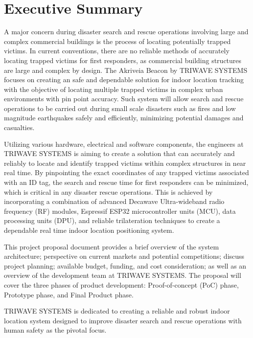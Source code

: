 

\section*{Executive Summary}	%
\bigskip
A major concern during disaster search and rescue operations involving large and complex commercial buildings is the process of locating potentially trapped victims. In current conventions, there are no reliable methods of accurately locating trapped victims for first responders, as commercial building structures are large and complex by design. The Akriveia Beacon by TRIWAVE SYSTEMS focuses on creating an safe and dependable solution for indoor location tracking with the objective of locating multiple trapped victims in complex urban environments with pin point accuracy. Such system will allow search and rescue operations to be carried out during small scale disasters such as fires and low magnitude earthquakes safely and efficiently, minimizing potential damages and casualties.

\bigskip
Utilizing various hardware, electrical and software components, the engineers at TRIWAVE SYSTEMS is aiming to create a solution that can accurately and reliably to locate and identify trapped victims within complex structures in near real time. By pinpointing the exact coordinates of any trapped victims associated with an ID tag, the search and rescue time for first responders can be minimized, which is critical in any disaster rescue operations. This is achieved by incorporating a combination of advanced Decawave Ultra-wideband radio frequency (\Gls{RF}) modules, Espressif ESP32 microcontroller units (\Gls{MCU}), data processing units (\Gls{DPU}), and reliable trilateration techniques to create a dependable real time indoor location positioning system.

\bigskip
This project proposal document provides a brief overview of the system architecture; perspective on current markets and potential competitions; discuss project planning; available budget, funding, and cost consideration; as well as an overview of the development team at TRIWAVE SYSTEMS. The proposal will cover the three phases of product development: Proof-of-concept (\Gls{PoC}) phase, Prototype phase, and Final Product phase.

\bigskip
TRIWAVE SYSTEMS is dedicated to creating a reliable and robust indoor location system designed to improve disaster search and rescue operations with human safety as the pivotal focus.
